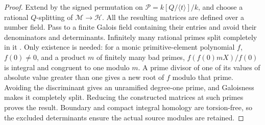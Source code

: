 \begin{proof}
Extend by the signed permutation on
\(\mathscr P=k[Q/\langle t\rangle]/k\), and choose a rational
\(Q\)-splitting of \(\mathscr M\to\mathscr H\).
All the resulting matrices are defined over a number field.
Pass to a finite Galois field containing their entries and avoid
their denominators and determinants.  Infinitely many rational
primes split completely in it
\citep[Theorem~8.31 and Corollary~8.32, p.~147]{MilneANT2020}.
Only existence is needed: for a monic primitive-element polynomial
\(f\), \(f(0)\ne0\), and a product \(m\) of finitely many bad primes,
\(f(f(0)mX)/f(0)\) is integral and congruent to one modulo \(m\).
A prime divisor of one of its values of absolute value greater
than one gives a new root of \(f\) modulo that prime.
Avoiding the discriminant gives an unramified degree-one prime,
and Galoisness makes it completely split.
Reducing the constructed matrices at such primes proves the result.
Boundary and compact integral homology are torsion-free, so the
excluded determinants ensure the actual source modules are retained.
\end{proof}

